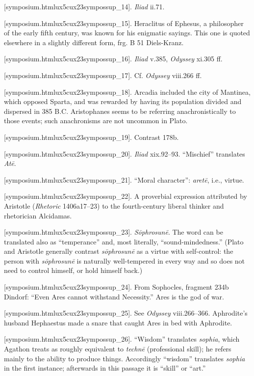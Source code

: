 [symposium.htmlux5cux23sympossup_14]. {\em Iliad} ii.71.

[symposium.htmlux5cux23sympossup_15]. Heraclitus of Ephesus, a
philosopher of the early fifth century, was known for his enigmatic
sayings. This one is quoted elsewhere in a slightly different form, frg.
B 51 Diels-Kranz.

[symposium.htmlux5cux23sympossup_16]. {\em Iliad} v.385,
{\em Odyssey} xi.305 ff.

[symposium.htmlux5cux23sympossup_17]. Cf. {\em Odyssey}
viii.266 ff.

[symposium.htmlux5cux23sympossup_18]. Arcadia included the city
of Mantinea, which opposed Sparta, and was rewarded by having its
population divided and dispersed in 385 B.C. Aristophanes seems to be
referring anachronistically to those events; such anachronisms are not
uncommon in Plato.

[symposium.htmlux5cux23sympossup_19]. Contrast 178b.

[symposium.htmlux5cux23sympossup_20]. {\em Iliad} xix.92--93.
“Mischief” translates {\em Atē}.

[symposium.htmlux5cux23sympossup_21]. “Moral character”:
{\em aretē}, i.e., virtue.

[symposium.htmlux5cux23sympossup_22]. A proverbial expression
attributed by Aristotle ({\em Rhetoric} 1406a17--23) to the
fourth-century liberal thinker and rhetorician Alcidamas.

[symposium.htmlux5cux23sympossup_23]. {\em Sōphrosunē}. The
word can be translated also as “temperance” and, most literally,
“sound-mindedness.” (Plato and Aristotle generally contrast
{\em sōphrosunē} as a virtue with self-control: the person with
{\em sōphrosunē} is naturally well-tempered in every way and so does not
need to control himself, or hold himself back.)

[symposium.htmlux5cux23sympossup_24]. From Sophocles, fragment
234b Dindorf: “Even Ares cannot withstand Necessity.” Ares is the god of
war.

[symposium.htmlux5cux23sympossup_25]. See {\em Odyssey}
viii.266--366. Aphrodite's husband Hephaestus made a snare that caught
Ares in bed with Aphrodite.

[symposium.htmlux5cux23sympossup_26]. “Wisdom” translates
{\em sophia}, which Agathon treats as roughly equivalent to {\em technē}
(professional skill); he refers mainly to the ability to produce things.
Accordingly “wisdom” translates {\em sophia} in the first instance;
afterwards in this passage it is “skill” or “art.”

